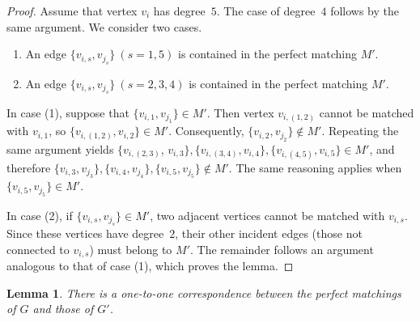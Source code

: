 \documentclass[a4paper,10pt]{article}
\newtheorem{lemma}{Lemma}
\begin{document}
\begin{proof}
    Assume that vertex $v_i$ has degree~$5$.
    The case of degree~$4$ follows by the same argument.
    We consider two cases.

    \begin{enumerate}[(1)]
    \item An edge $\{v_{i,s},v_{j_s}\}~(s=1,5)$ is contained in the perfect matching $M'$.
    \item An edge $\{v_{i,s},v_{j_s}\}~(s=2,3,4)$ is contained in the perfect matching $M'$.
    \end{enumerate}
    
    In case (1), suppose that $\{v_{i,1},v_{j_1}\}\in M'$.
    Then vertex $v_{i,(1,2)}$ cannot be matched with $v_{i,1}$, so $\{v_{i,(1,2)}, v_{i,2}\}\in M'$.
    Consequently, $\{v_{i,2}, v_{j_2}\}\notin M'$.
    Repeating the same argument yields
    $\{v_{i,(2,3)}$, $v_{i,3}\}, \{v_{i,(3,4)}, v_{i,4}\}, \{v_{i,(4,5)}, v_{i,5}\}\in M'$,
    and therefore
    $\{v_{i,3}, v_{j_3}\}, \{v_{i,4}, v_{j_4}\}, \{v_{i,5}, v_{j_5}\}\notin M'$.
    The same reasoning applies when $\{v_{i,5},v_{j_5}\}\in M'$.

    In case (2), if $\{v_{i,s}, v_{j_s}\} \in M'$, two adjacent vertices cannot be matched with $v_{i,s}$.
    Since these vertices have degree~$2$, their other incident edges (those not connected to $v_{i,s}$) must belong to $M'$.
    The remainder follows an argument analogous to that of case (1), which proves the lemma.
\end{proof}

\begin{lemma}\label{lem:one_to_one_ch4}
    There is a one-to-one correspondence between the perfect matchings of $G$ and those of $G'$.
\end{lemma}
\end{document}
